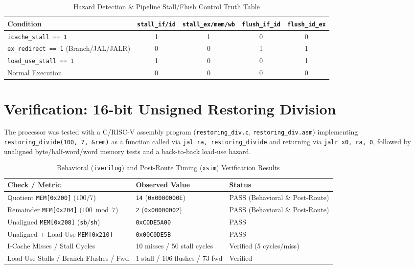 \documentclass[11pt,a4paper]{article}
\begin{document}
\begin{table}[htbp]
\centering
\caption{Hazard Detection \& Pipeline Stall/Flush Control Truth Table}
\begin{tabular}{@{}lcccc@{}}
\toprule
\textbf{Condition} & \texttt{stall\_if/id} & \texttt{stall\_ex/mem/wb} & \texttt{flush\_if\_id} & \texttt{flush\_id\_ex} \\ \midrule
\texttt{icache\_stall == 1} & 1 & 1 & 0 & 0 \\
\texttt{ex\_redirect == 1} (Branch/JAL/JALR) & 0 & 0 & 1 & 1 \\
\texttt{load\_use\_stall == 1} & 1 & 0 & 0 & 1 \\
Normal Execution & 0 & 0 & 0 & 0 \\ \bottomrule
\end{tabular}
\label{tab:hazard}
\end{table}

\section{Verification: 16-bit Unsigned Restoring Division}
The processor was tested with a C/RISC-V assembly program (\texttt{restoring\_div.c}, \texttt{restoring\_div.asm}) implementing \texttt{restoring\_divide(100, 7, \&rem)} as a function called via \texttt{jal ra, restoring\_divide} and returning via \texttt{jalr x0, ra, 0}, followed by unaligned byte/half-word/word memory tests and a back-to-back load-use hazard.

\begin{table}[htbp]
\centering
\caption{Behavioral (\texttt{iverilog}) and Post-Route Timing (\texttt{xsim}) Verification Results}
\begin{tabular}{@{}lll@{}}
\toprule
\textbf{Check / Metric} & \textbf{Observed Value} & \textbf{Status} \\ \midrule
Quotient \texttt{MEM[0x200]} ($100 / 7$) & \texttt{14} (\texttt{0x0000000E}) & PASS (Behavioral \& Post-Route) \\
Remainder \texttt{MEM[0x204]} ($100 \bmod 7$) & \texttt{2} (\texttt{0x00000002}) & PASS (Behavioral \& Post-Route) \\
Unaligned \texttt{MEM[0x208]} (\texttt{sb}/\texttt{sh}) & \texttt{0xC0DE5A00} & PASS \\
Unaligned + Load-Use \texttt{MEM[0x210]} & \texttt{0x00C0DE5B} & PASS \\
I-Cache Misses / Stall Cycles & 10 misses / 50 stall cycles & Verified (5 cycles/miss) \\
Load-Use Stalls / Branch Flushes / Fwd & 1 stall / 106 flushes / 73 fwd & Verified \\ \bottomrule
\end{tabular}
\end{table}
\end{document}
